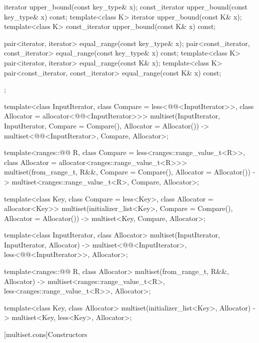 \begin{codeblock}
{{    iterator       upper_bound(const key_type& x);
    const_iterator upper_bound(const key_type& x) const;
    template<class K> iterator       upper_bound(const K& x);
    template<class K> const_iterator upper_bound(const K& x) const;

    pair<iterator, iterator>               equal_range(const key_type& x);
    pair<const_iterator, const_iterator>   equal_range(const key_type& x) const;
    template<class K>
      pair<iterator, iterator>             equal_range(const K& x);
    template<class K>
      pair<const_iterator, const_iterator> equal_range(const K& x) const;
  };

  template<class InputIterator,
           class Compare = less<@@<InputIterator>>,
           class Allocator = allocator<@@<InputIterator>>>
    multiset(InputIterator, InputIterator,
             Compare = Compare(), Allocator = Allocator())
      -> multiset<@@<InputIterator>, Compare, Allocator>;

  template<ranges::@@ R, class Compare = less<ranges::range_value_t<R>>,
           class Allocator = allocator<ranges::range_value_t<R>>>
    multiset(from_range_t, R&&, Compare = Compare(), Allocator = Allocator())
      -> multiset<ranges::range_value_t<R>, Compare, Allocator>;

  template<class Key, class Compare = less<Key>, class Allocator = allocator<Key>>
    multiset(initializer_list<Key>, Compare = Compare(), Allocator = Allocator())
      -> multiset<Key, Compare, Allocator>;

  template<class InputIterator, class Allocator>
    multiset(InputIterator, InputIterator, Allocator)
      -> multiset<@@<InputIterator>,
                  less<@@<InputIterator>>, Allocator>;

  template<ranges::@@ R, class Allocator>
    multiset(from_range_t, R&&, Allocator)
      -> multiset<ranges::range_value_t<R>, less<ranges::range_value_t<R>>, Allocator>;

  template<class Key, class Allocator>
    multiset(initializer_list<Key>, Allocator) -> multiset<Key, less<Key>, Allocator>;
}
\end{codeblock}%
%

[multiset.cons]{Constructors}

